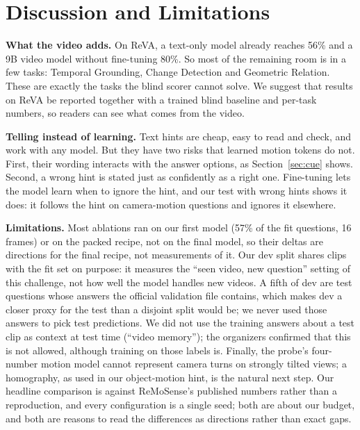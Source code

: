 \section{Discussion and Limitations}

\textbf{What the video adds.} On ReVA, a text-only model already
reaches 56\% and a 9B video model without fine-tuning 80\%. So most of the remaining
room is in a few tasks: Temporal Grounding, Change Detection and Geometric
Relation. These are exactly the tasks the blind scorer cannot solve. We
suggest that results on ReVA be reported together with a trained blind
baseline and per-task numbers, so readers can see what comes from the
video.

\textbf{Telling instead of learning.} Text hints are cheap, easy to read
and check, and work with any model. But they have two risks that learned
motion tokens do not. First, their wording interacts with the answer
options, as Section~\ref{sec:cue} shows. Second, a wrong hint is stated
just as confidently as a right one. Fine-tuning lets the model learn when
to ignore the hint, and our test with wrong hints shows it does: it follows
the hint on camera-motion questions and ignores it elsewhere.

\textbf{Limitations.} Most ablations ran on our first model (57\% of the
fit questions, 16 frames) or on the packed recipe, not on the final model,
so their deltas are directions for the final recipe, not measurements of
it. Our dev split shares clips with the fit set on purpose: it measures
the ``seen video, new question'' setting of this challenge, not how well
the model handles new videos. A fifth of dev are test questions whose
answers the official validation file contains, which makes dev a closer
proxy for the test than a disjoint split would be; we never used those
answers to pick test predictions. We did not use the
training answers about a test clip as context at test time (``video
memory''); the organizers confirmed that this is not allowed, although
training on those labels is. Finally, the probe's four-number motion model
cannot represent camera turns on strongly tilted views; a homography, as
used in our object-motion hint, is the natural next step. Our headline
comparison is against ReMoSense's published numbers rather than a
reproduction, and every configuration is a single seed; both are about our
budget, and both are reasons to read the differences as directions rather
than exact gaps.


